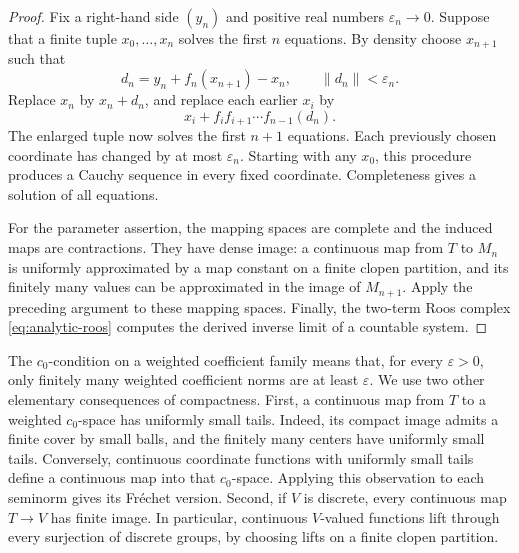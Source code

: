 \begin{proof}
Fix a right-hand side \((y_n)\) and positive real numbers
\(\varepsilon_n\to0\).  Suppose that a finite tuple
\(x_0,\ldots,x_n\) solves the first \(n\) equations.  By density choose
\(x_{n+1}\) such that
\[
 d_n=y_n+f_n(x_{n+1})-x_n,\qquad \|d_n\|<\varepsilon_n.
\]
Replace \(x_n\) by \(x_n+d_n\), and replace each earlier \(x_i\) by
\[
 x_i+f_i f_{i+1}\cdots f_{n-1}(d_n).
\]
The enlarged tuple now solves the first \(n+1\) equations.  Each
previously chosen coordinate has changed by at most
\(\varepsilon_n\).  Starting with any \(x_0\), this procedure produces
a Cauchy sequence in every fixed coordinate.  Completeness gives a
solution of all equations.

For the parameter assertion, the mapping spaces are complete and
the induced maps are contractions.  They have dense image: a
continuous map from \(T\) to \(M_n\) is uniformly approximated by a map
constant on a finite clopen partition, and its finitely many values
can be approximated in the image of \(M_{n+1}\).  Apply the preceding
argument to these mapping spaces.  Finally, the two-term Roos
complex \eqref{eq:analytic-roos} computes the derived inverse limit
of a countable system.
\end{proof}

The \(c_0\)-condition on a weighted coefficient family means that,
for every \(\varepsilon>0\), only finitely many weighted coefficient
norms are at least \(\varepsilon\).
We use two other elementary consequences of compactness.  First, a
continuous map from \(T\) to a weighted \(c_0\)-space has uniformly
small tails.  Indeed, its compact image admits a finite cover by
small balls, and the finitely many centers have uniformly small
tails.  Conversely, continuous coordinate functions with uniformly
small tails define a continuous map into that \(c_0\)-space.  Applying
this observation to each seminorm gives its Fr\'echet version.
Second, if \(V\) is discrete, every continuous map \(T\to V\) has
finite image.  In particular, continuous \(V\)-valued functions lift
through every surjection of discrete groups, by choosing lifts on
a finite clopen partition.

